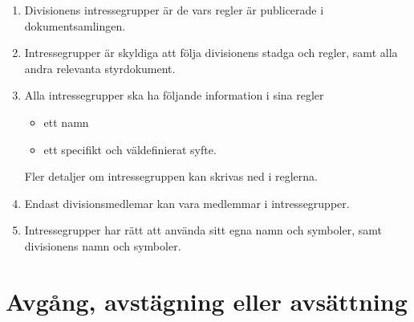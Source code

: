 \documentclass{dvd}
\begin{document}
	\begin{enumerate}[label=\arabic* §, ref=\arabic*]
		\item Divisionens intressegrupper är de vars regler är publicerade i dokumentsamlingen.

		\item Intressegrupper är skyldiga att följa divisionens stadga och regler, samt alla andra relevanta styrdokument.

		\item Alla intressegrupper ska ha följande information i sina regler

		\begin{itemize}
			\item ett namn
			\item ett specifikt och väldefinierat syfte.
		\end{itemize}

		Fler detaljer om intressegruppen kan skrivas ned i reglerna.

		\item Endast divisionsmedlemar kan vara medlemmar i intressegrupper.

		\item Intressegrupper har rätt att använda sitt egna namn och symboler, samt divisionens namn och symboler.
	\end{enumerate}

	\section{Avgång, avstägning eller avsättning}
\end{document}
